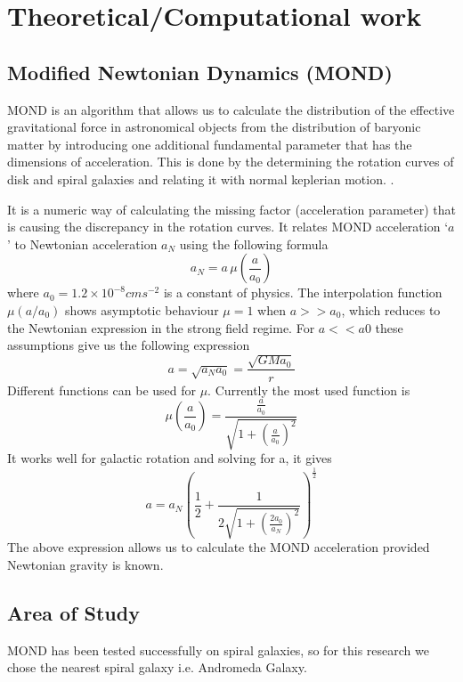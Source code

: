   \chapter{Theoretical/Computational work}
  
\section{Modified Newtonian Dynamics (MOND)}

MOND is an algorithm that allows us to calculate the distribution of the effective gravitational force in astronomical objects from the distribution of baryonic matter by introducing one additional fundamental parameter that has the dimensions of acceleration. This  is done by the determining the rotation curves of disk and spiral galaxies and relating it with normal keplerian motion. \cite{dm_2}.

 It is a numeric way of calculating  the missing factor (acceleration parameter) that is causing the discrepancy in the rotation curves. It relates MOND acceleration `$a$' to Newtonian acceleration $a_{N}$ using the following formula \begin{equation}
 a_{N}= a\,\mu(\frac{a}{a_{0}})
\end{equation}
where $a_{0} = 1.2 \times 10^{-8} cm s^{-2}$  is a constant of physics.
The interpolation function $\mu (a/a_0)$ shows asymptotic behaviour $\mu=1$ when $a>> a_0$,  which reduces to the Newtonian expression in the strong field regime. For $a << a0$  these assumptions give us the following expression
\begin{equation}
a= \sqrt{a_{N}a_{0}}= \frac{\sqrt{GMa_{0}}}{r}
\end{equation}
Different functions can be used for $\mu$. Currently the most used function is
\begin{equation}
\mu (\frac{a}{a_{0}}) = \frac{\displaystyle \frac{a}{a_{0}}}{\sqrt{1+(\displaystyle \frac{a}{a_{0}})^2}}
\end{equation}
It works well for galactic rotation and solving for a, it gives
\begin{equation}
a= a_{N}(\frac{1}{2}+\frac{1}{2\sqrt{1+(\displaystyle \frac{2a_{0}}{a_{N}})^2}})^\frac{1}{2}
\end{equation}
The above expression allows us to calculate the MOND acceleration provided Newtonian gravity is known.

\section{Area of Study}
  MOND has been tested successfully on spiral galaxies, so for this research we chose the nearest spiral galaxy i.e. Andromeda Galaxy. 

